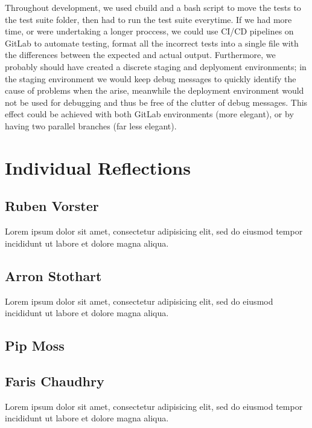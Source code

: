 \documentclass[11pt]{article}
\begin{document}
Throughout development, we used cbuild and a bash script to move the tests to the test suite folder, then had to run the test suite everytime. If we had more time, or were undertaking a longer proccess, we could use CI/CD pipelines on GitLab to automate testing, format all the incorrect tests into a single file with the differences between the expected and actual output. Furthermore, we probably should have created a discrete staging and deplyoment environments; in the staging environment we would keep debug messages to quickly identify the cause of problems when the arise, meanwhile the deployment environment would not be used for debugging and thus be free of the clutter of debug messages. This effect could be achieved with both GitLab environments (more elegant), or by having two parallel branches (far less elegant).

\section{Individual Reflections}
\subsection{Ruben Vorster}
Lorem ipsum dolor sit amet, consectetur adipisicing elit, sed do eiusmod tempor
incididunt ut labore et dolore magna aliqua.

\subsection{Arron Stothart}
Lorem ipsum dolor sit amet, consectetur adipisicing elit, sed do eiusmod 
incididunt ut labore et dolore magna aliqua.

\subsection{Pip Moss}


\subsection{Faris Chaudhry}
Lorem ipsum dolor sit amet, consectetur adipisicing elit, sed do eiusmod tempor
incididunt ut labore et dolore magna aliqua.
\end{document}

